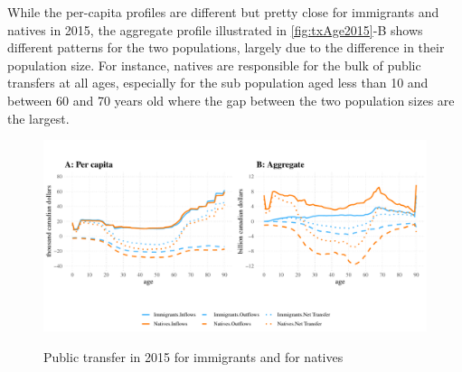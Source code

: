 \vspace{0.7em}\par
While the per-capita profiles are different but pretty close for immigrants and natives in 2015, the aggregate profile illustrated in \autoref{fig:txAge2015}-B shows different patterns for the two populations, largely due to the difference in their population size.
For instance, natives are responsible for the bulk of public transfers at all ages, especially for the sub population aged less than 10 and between 60 and 70 years old where the gap between the two population sizes are the largest.

\begin{figure}[H]%
  \caption{Public transfer in 2015 for immigrants and for natives}
  \includegraphics[width=1\textwidth]{res/txAge2015.pdf}%
  \label{fig:txAge2015}%
\end{figure}%